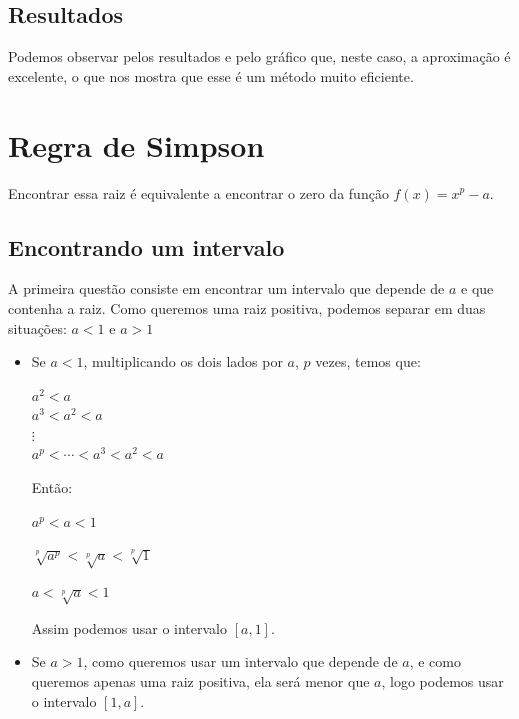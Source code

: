 \documentclass[11pt, openright, a4paper, brazil, openany, oneside]{abntex2}
\begin{document}
\section{Resultados}

Podemos observar pelos resultados e pelo gráfico que, neste caso, a aproximação é excelente, o que nos mostra que esse é um método muito eficiente.


\chapter{Regra de Simpson}



Encontrar essa raiz é equivalente a encontrar o zero da função $ f(x) = x^p - a $.

\section{Encontrando um intervalo}

A primeira questão consiste em encontrar um intervalo que depende de $a$ e que contenha a raiz. Como queremos uma raiz positiva, podemos separar em duas situações: $a<1$ e $a>1$ 

\begin{itemize}
\item Se $a<1$, multiplicando os dois lados por $a$, $p$ vezes,  temos que:

\begin{center}


$a^2<a$  \\ $a^3<a^2<a$ \\ $ \vdots $ \\ $a^p< \cdots < a^3 < a^2 < a$

\end{center}

Então: 
\begin{center}

$ a^p<a<1 $

$ \sqrt[p]{a^p}<\sqrt[p]{a}<\sqrt[p]{1} $

$ a<\sqrt[p]{a}<1 $


\end{center}

Assim podemos usar o intervalo $[a,1]$.

\item Se $a>1$, como queremos usar um intervalo que depende de $a$, e como queremos apenas uma raiz positiva, ela será menor que $a$, logo podemos usar o intervalo $[1,a]$.


\end{itemize}
\end{document}
